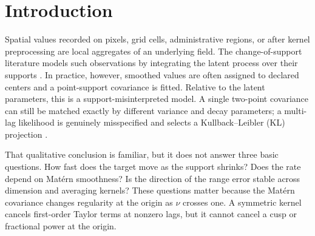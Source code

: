 \documentclass[11pt]{article}
\theoremstyle{remark}
\begin{document}
\section{Introduction}

Spatial values recorded on pixels, grid cells, administrative regions, or after
kernel preprocessing are local aggregates of an underlying field.  The
change-of-support literature models such observations by integrating the latent
process over their supports \citep{gelfand2001support,chacon2024change}.  In
practice, however, smoothed values are often assigned to declared centers and a
point-support covariance is fitted.  Relative to the latent parameters, this is
a support-misinterpreted model.  A single two-point covariance can still be
matched exactly by different variance and decay parameters; a multi-lag
likelihood is genuinely misspecified and selects a Kullback--Leibler (KL)
projection \citep{bachoc2018misspecified}.

That qualitative conclusion is familiar, but it does not answer three basic
questions.  How fast does the target move as the support shrinks?  Does the rate
depend on Mat\'ern smoothness?  Is the direction of the range error stable across
dimension and averaging kernels?  These questions matter because the Mat\'ern
covariance changes regularity at the origin as \(\nu\) crosses one.  A symmetric
kernel cancels first-order Taylor terms at nonzero lags, but it cannot cancel a
cusp or fractional power at the origin.
\end{document}
